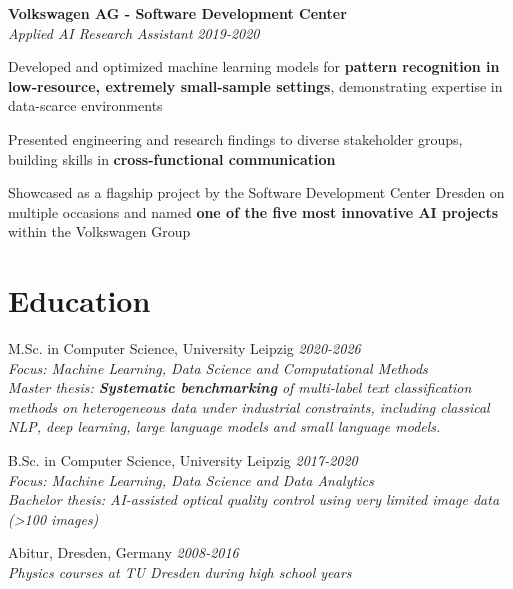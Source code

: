 \documentclass[margin,line]{resume}
\begin{document}
\begin{resume}
        \textbf{Volkswagen AG - Software Development Center}\\
        \textit{Applied AI Research Assistant} \hfill \textsl{2019-2020}\\
        \begin{list2}\setlength\itemsep{0.75mm}
        \item Developed and optimized machine learning models for \textbf{pattern recognition in low-resource, extremely small-sample settings}, demonstrating expertise in data-scarce environments
        \item Presented engineering and research findings to diverse stakeholder groups, building skills in \textbf{cross-functional communication}
        \item Showcased as a flagship project by the Software Development Center Dresden on multiple occasions and named \textbf{one of the five most innovative AI projects} within the Volkswagen Group
        \end{list2}

    \section{\mysidestyle \normalsize{Education}}
        \begin{list2}\setlength\itemsep{0.75mm}
            \item{M.Sc. in Computer Science, University Leipzig \hfill \textsl{2020-2026}\\
            \textit{Focus: Machine Learning, Data Science and Computational Methods}\\
            \textit{Master thesis: \textbf{Systematic benchmarking} of multi-label text classification methods on heterogeneous data under industrial constraints, including classical NLP, deep learning, large language models and small language models.}}

            \item{B.Sc. in Computer Science, University Leipzig \hfill \textsl{2017-2020}\\
            \textit{Focus: Machine Learning, Data Science and Data Analytics}\\
            \textit{Bachelor thesis: AI-assisted optical quality control using very limited image data (>100 images)}}
            
            \item{Abitur, Dresden, Germany \hfill \textsl{2008-2016}\\
            \textit{Physics courses at TU Dresden during high school years}}
            

\end{list2}
\end{resume}
\end{document}
